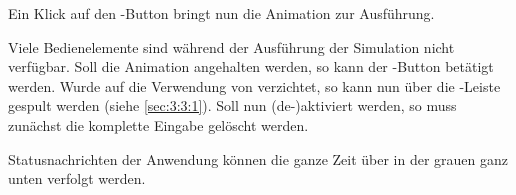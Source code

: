 Ein Klick auf den -Button bringt nun die Animation zur Ausführung.

Viele Bedienelemente sind während der Ausführung der Simulation nicht
verfügbar. Soll die Animation angehalten werden, so kann der
-Button betätigt werden. Wurde auf die Verwendung von
 verzichtet, so kann nun über die
-Leiste \glqq{}gespult\grqq{} werden (siehe
\ref{sec:3:3:1}). Soll  nun (de-)aktiviert werden, so
muss zunächst die komplette Eingabe gelöscht werden.

Statusnachrichten der Anwendung können die ganze Zeit über in der grauen
 ganz unten verfolgt werden.
